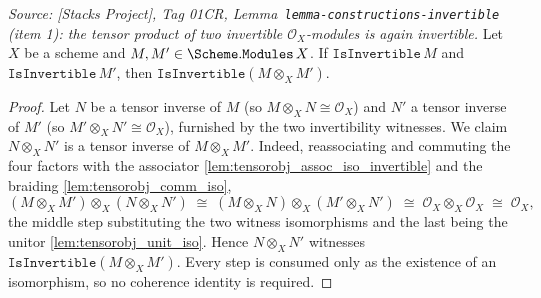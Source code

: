 \begin{lemma}\leanok
  \label{lem:isinvertible_tensor}
  \textit{Source: [Stacks Project], Tag 01CR,
  Lemma~\texttt{lemma-constructions-invertible} (item 1): the tensor product of two
  invertible \(\mathcal{O}_X\)-modules is again invertible.}
  Let \(X\) be a scheme and \(M, M' \in \Scheme.\mathtt{Modules}\,X\). If
  \(\mathtt{IsInvertible}\,M\) and \(\mathtt{IsInvertible}\,M'\), then
  \(\mathtt{IsInvertible}(M \otimes_X M')\).
\end{lemma}

\begin{proof}
  \leanok
  Let \(N\) be a tensor inverse of \(M\) (so \(M \otimes_X N \cong \mathcal{O}_X\))
  and \(N'\) a tensor inverse of \(M'\) (so \(M' \otimes_X N' \cong \mathcal{O}_X\)),
  furnished by the two invertibility witnesses. We claim \(N \otimes_X N'\) is a
  tensor inverse of \(M \otimes_X M'\). Indeed, reassociating and commuting the four
  factors with the associator \cref{lem:tensorobj_assoc_iso_invertible} and the
  braiding \cref{lem:tensorobj_comm_iso},
  \[
    (M \otimes_X M') \otimes_X (N \otimes_X N')
    \;\cong\;
    (M \otimes_X N) \otimes_X (M' \otimes_X N')
    \;\cong\;
    \mathcal{O}_X \otimes_X \mathcal{O}_X
    \;\cong\;
    \mathcal{O}_X,
  \]
  the middle step substituting the two witness isomorphisms and the last being the
  unitor \cref{lem:tensorobj_unit_iso}. Hence \(N \otimes_X N'\) witnesses
  \(\mathtt{IsInvertible}(M \otimes_X M')\). Every step is consumed only as the
  existence of an isomorphism, so no coherence identity is required.
\end{proof}

